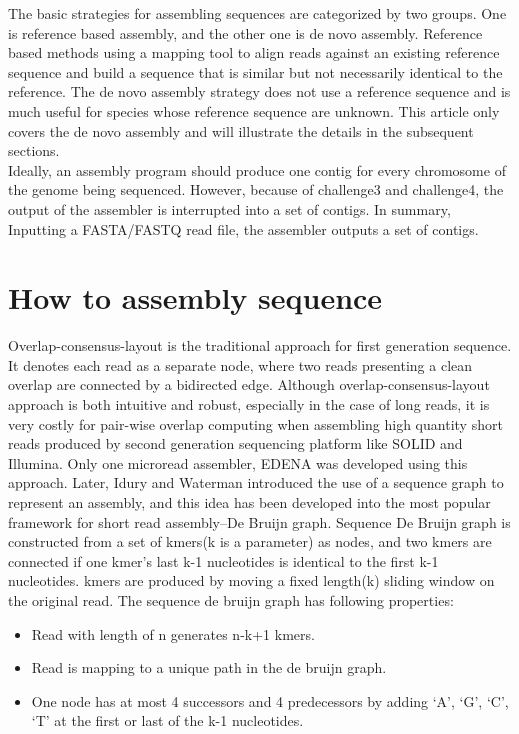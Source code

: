 \documentclass{article}
\begin{document}
\noindent The basic strategies for assembling sequences are categorized by two groups. One is reference based assembly, and the other one is de novo assembly. Reference based methods using a mapping tool to align reads against an existing reference sequence and build a sequence that is similar but not necessarily identical to the reference. The de novo assembly strategy does not use a reference sequence and is much useful for species whose reference sequence are unknown. This article only covers the de novo assembly and will illustrate the details in the subsequent sections.\\
Ideally, an assembly program should produce one contig for every chromosome of the genome being sequenced. However, because of challenge3 and challenge4, the output of the assembler is interrupted into a set of contigs. In summary, Inputting a FASTA/FASTQ read file, the assembler outputs a set of contigs.
\section{How to assembly sequence}
Overlap-consensus-layout \cite{myers1995toward} is the traditional approach for first generation sequence. It denotes each read as a separate node, where two reads presenting a clean overlap are connected by a bidirected edge. Although overlap-consensus-layout approach is both intuitive and robust, especially in the case of long reads, it is very costly for pair-wise overlap computing when assembling high quantity short reads produced by second generation sequencing platform like SOLID and Illumina. Only one microread assembler, EDENA \cite{hernandez2008novo} was developed using this approach. Later, Idury and Waterman \cite{idury1995new} introduced the use of a sequence graph to represent an assembly, and this idea has been developed into the most popular framework for short read assembly--De Bruijn graph. Sequence De Bruijn graph is constructed from a set of kmers(k is a parameter) as nodes, and two kmers are connected if one kmer's last k-1 nucleotides is identical to the first k-1 nucleotides. kmers are produced by moving a fixed length(k) sliding window on the original read. The sequence de bruijn graph has following properties:
\begin{itemize}
 \item Read with length of n generates n-k+1 kmers.
 \item Read is mapping to a unique path in the de bruijn graph.
 \item One node has at most 4 successors and 4 predecessors by adding `A', `G', `C', `T' at the first or last of the k-1 nucleotides.
\end{itemize}
\renewcommand\refname{Reference}


\end{document}
